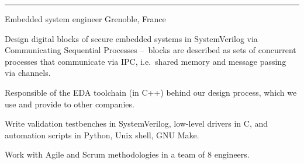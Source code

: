 \vspace{+2mm}\vspace{-3mm}
\rule{\textwidth}{0.5pt}\vspace{-1mm}

\begin{cventries}
\vspace{-5mm}

\cventry
{}
{\vspace{-9mm}Embedded system engineer } %
{\vspace{-9mm}\normalcolor Grenoble, France} %
{} %
{
\begin{cvitems}
\item{Design digital blocks of secure embedded systems in SystemVerilog via 
Communicating Sequential Processes --~blocks are described as sets of 
concurrent processes that communicate via IPC, i.e.~shared memory and message 
passing via channels.}
\item{Responsible of the EDA toolchain (in C++) behind our design process, 
which we use and provide to other companies.}
\item{Write validation testbenches in SystemVerilog, low-level drivers 
in C, and automation scripts in Python, Unix shell, GNU Make.}
\item{Work with Agile and Scrum methodologies in a team of 8 engineers.}
\end{cvitems}
}
\vspace{-5mm}


\end{cventries}
